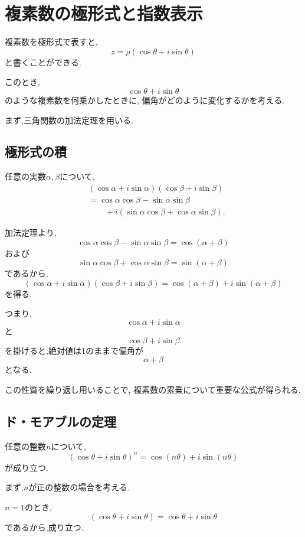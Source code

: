 
\section{複素数の極形式と指数表示}

複素数を極形式で表すと,
\[
  z
  =
  \rho(
    \cos\theta+i\sin\theta
  )
\]
と書くことができる.

このとき,
\[
  \cos\theta+i\sin\theta
\]
のような複素数を何乗かしたときに,
偏角がどのように変化するかを考える.

まず,三角関数の加法定理を用いる.


\subsection{極形式の積}

  任意の実数$\alpha,\beta$について,
  \begin{align*}
    &(\cos\alpha+i\sin\alpha)
    (\cos\beta+i\sin\beta)\\
    &=
    \cos\alpha\cos\beta
    -\sin\alpha\sin\beta\\
    &\qquad
    +i(
      \sin\alpha\cos\beta
      +\cos\alpha\sin\beta
    ).
  \end{align*}

  加法定理より,
  \[
    \cos\alpha\cos\beta
    -\sin\alpha\sin\beta
    =
    \cos(\alpha+\beta)
  \]
  および
  \[
    \sin\alpha\cos\beta
    +\cos\alpha\sin\beta
    =
    \sin(\alpha+\beta)
  \]
  であるから,
  \[
    (\cos\alpha+i\sin\alpha)
    (\cos\beta+i\sin\beta)
    =
    \cos(\alpha+\beta)
    +i\sin(\alpha+\beta)
  \]
  を得る.

  つまり,
  \[
    \cos\alpha+i\sin\alpha
  \]
  と
  \[
    \cos\beta+i\sin\beta
  \]
  を掛けると,絶対値は1のままで偏角が
  \[
    \alpha+\beta
  \]
  となる.

  この性質を繰り返し用いることで,
  複素数の累乗について重要な公式が得られる.


\subsection{ド・モアブルの定理}

  任意の整数$n$について,
  \[
    (\cos\theta+i\sin\theta)^n
    =
    \cos(n\theta)+i\sin(n\theta)
  \]
  が成り立つ.

  まず,$n$が正の整数の場合を考える.

  $n=1$のとき,
  \[
    (\cos\theta+i\sin\theta)
    =
    \cos\theta+i\sin\theta
  \]
  であるから,成り立つ.

